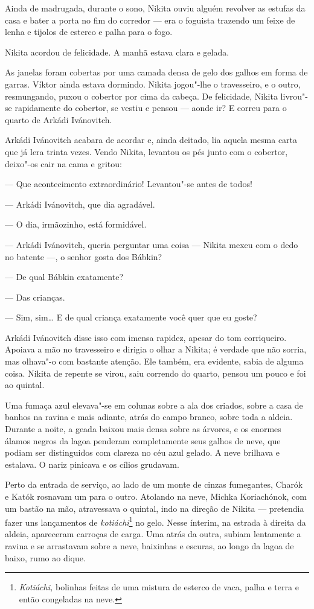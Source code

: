 Ainda de madrugada, durante o sono, Nikita ouviu alguém revolver as
estufas da casa e bater a porta no fim do corredor --- era o foguista
trazendo um feixe de lenha e tijolos de esterco e palha para o fogo.

Nikita acordou de felicidade. A manhã estava clara e gelada.

As janelas foram cobertas por uma camada densa de gelo dos galhos em
forma de garras. Víktor ainda estava dormindo. Nikita jogou"-lhe o
travesseiro, e o outro, resmungando, puxou o cobertor por cima da
cabeça. De felicidade, Nikita livrou"-se rapidamente do cobertor, se
vestiu e pensou --- aonde ir? E correu para o quarto de Arkádi
Ivánovitch.

Arkádi Ivánovitch acabara de acordar e, ainda deitado, lia aquela mesma
carta que já lera trinta vezes. Vendo Nikita, levantou os pés junto com
o cobertor, deixo"-os cair na cama e gritou:

--- Que acontecimento extraordinário! Levantou"-se antes de todos!

--- Arkádi Ivánovitch, que dia agradável.

--- O dia, irmãozinho, está formidável.

--- Arkádi Ivánovitch, queria perguntar uma coisa --- Nikita mexeu com o
dedo no batente ---, o senhor gosta dos Bábkin?

--- De qual Bábkin exatamente?

--- Das crianças.

--- Sim, sim\ldots{} E de qual criança exatamente você quer que eu goste?

Arkádi Ivánovitch disse isso com imensa rapidez, apesar do tom
corriqueiro. Apoiava a mão no travesseiro e dirigia o olhar a Nikita; é
verdade que não sorria, mas olhava"-o com bastante atenção. Ele também,
era evidente, sabia de alguma coisa. Nikita de repente se virou, saiu
correndo do quarto, pensou um pouco e foi ao quintal.

Uma fumaça azul elevava"-se em colunas sobre a ala dos criados, sobre a
casa de banhos na ravina e mais adiante, atrás do campo branco, sobre
toda a aldeia. Durante a noite, a geada baixou mais densa sobre as
árvores, e os enormes álamos negros da lagoa penderam completamente seus
galhos de neve, que podiam ser distinguidos com clareza no céu azul
gelado. A neve brilhava e estalava. O nariz pinicava e os cílios
grudavam.

Perto da entrada de serviço, ao lado de um monte de cinzas fumegantes,
Charók e Katók rosnavam um para o outro. Atolando na neve, Michka
Koriachónok, com um bastão na mão, atravessava o quintal, indo na
direção de Nikita --- pretendia fazer uns lançamentos de
\emph{kotiáchi}\footnote{\emph{Kotiáchi,} bolinhas feitas de uma mistura
  de esterco de vaca, palha e terra e então congeladas na neve.} no
gelo. Nesse ínterim, na estrada à direita da aldeia, apareceram carroças
de carga. Uma atrás da outra, subiam lentamente a ravina e se arrastavam
sobre a neve, baixinhas e escuras, ao longo da lagoa de baixo, rumo ao
dique.

